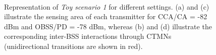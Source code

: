 \documentclass[preprint,12pt]{elsarticle}
\begin{document}
\begin{figure}[h!]
	\centering
	\hspace{1cm}
	\\
	\hspace{1cm}
	\caption{Representation of \emph{Toy scenario 1} for different settings. (a) and (c) illustrate the sensing area of each transmitter for CCA/CA = -82 dBm and OBSS/PD = -78 dBm, whereas (b) and (d) illustrate the corresponding inter-BSS interactions through CTMNs (unidirectional transitions are shown in red).}
	\label{fig:toy_scenario_1b}
\end{figure}
\end{document}
